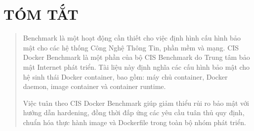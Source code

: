 \section*{TÓM TẮT}
\label{tuxf3m-tux1eaft}

\begin{quote}
Benchmark là một hoạt động cần thiết cho việc định hình cấu hình bảo mật cho các hệ thống Công Nghệ Thông Tin, phần mềm và mạng. CIS Docker Benchmark là một phần của bộ CIS Benchmark do Trung tâm bảo mật Internet phát triển. Tài liệu này định nghĩa các cấu hình bảo mật cho hệ sinh thái Docker container, bao gồm: máy chủ container, Docker daemon, image container và container runtime.

Việc tuân theo CIS Docker Benchmark giúp giảm thiểu rủi ro bảo mật với hướng dẫn hardening, đồng thời đấp ứng các yêu cầu tuân thủ quy định, chuẩn hóa thực hành image và Dockerfile trong toàn bộ nhóm phát triển.
\end{quote}
